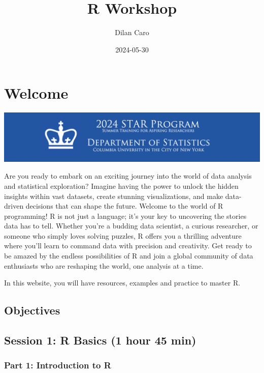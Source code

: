 \documentclass[
]{book}
\title{R Workshop}
\author{Dilan Caro}
\date{2024-05-30}
\begin{document}
\maketitle

{
\setcounter{tocdepth}{1}
\tableofcontents
}
\chapter*{Welcome}\label{welcome}

\includegraphics[width=1\linewidth]{images/CU STAR}

Are you ready to embark on an exciting journey into the world of data analysis and statistical exploration? Imagine having the power to unlock the hidden insights within vast datasets, create stunning visualizations, and make data-driven decisions that can shape the future. Welcome to the world of R programming! R is not just a language; it's your key to uncovering the stories data has to tell. Whether you're a budding data scientist, a curious researcher, or someone who simply loves solving puzzles, R offers you a thrilling adventure where you'll learn to command data with precision and creativity. Get ready to be amazed by the endless possibilities of R and join a global community of data enthusiasts who are reshaping the world, one analysis at a time.

In this website, you will have resources, examples and practice to master R.

\section*{Objectives}\label{objectives}

\section*{Session 1: R Basics (1 hour 45 min)}\label{session-1-r-basics-1-hour-45-min}

\subsection*{Part 1: Introduction to R}\label{part-1-introduction-to-r}
\end{document}

